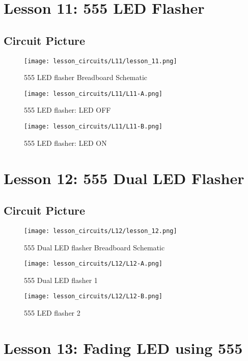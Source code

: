 \section{Lesson 11: 555 LED Flasher}
\subsection{Circuit Picture}
\begin{figure}[htp]
    \centering
    \texttt{[image: lesson\_circuits/L11/lesson\_11.png]}
    \caption{555 LED flasher Breadboard Schematic}
    \label{fig:555_led_sch}
\end{figure}
\begin{figure}[htp]
    \centering
    \texttt{[image: lesson\_circuits/L11/L11-A.png]}
    \caption{555 LED flasher: LED OFF}
    \label{fig:555_led_obb}
\end{figure}
\begin{figure}[htp]
    \centering
    \texttt{[image: lesson\_circuits/L11/L11-B.png]}
    \caption{555 LED flasher: LED ON}
    \label{fig:555_led_obb1}
\end{figure}

\section{Lesson 12: 555 Dual LED Flasher}
\subsection{Circuit Picture}
\begin{figure}[htp]
    \centering
    \texttt{[image: lesson\_circuits/L12/lesson\_12.png]}
    \caption{555 Dual LED flasher Breadboard Schematic}
    \label{fig:555_2led_sch}
\end{figure}
\begin{figure}[htp]
    \centering
    \texttt{[image: lesson\_circuits/L12/L12-A.png]}
    \caption{555 Dual LED flasher 1}
    \label{fig:555_2led_obb}
\end{figure}
\begin{figure}[htp]
    \centering
    \texttt{[image: lesson\_circuits/L12/L12-B.png]}
    \caption{555 LED flasher 2}
    \label{fig:555_2led_obb1}
\end{figure}

\section{Lesson 13: Fading LED using 555}
